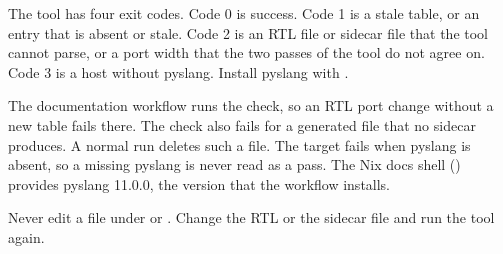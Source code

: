 The tool has four exit codes. Code 0 is success. Code 1 is a stale table, or an entry that is absent or stale. Code 2 is an RTL file or sidecar file that the tool cannot parse, or a port width that the two passes of the tool do not agree on. Code 3 is a host without pyslang. Install pyslang with .

The documentation workflow runs the check, so an RTL port change without a new table fails there. The check also fails for a generated file that no sidecar produces. A normal run deletes such a file. The target  fails when pyslang is absent, so a missing pyslang is never read as a pass. The Nix docs shell () provides pyslang 11.0.0, the version that the workflow installs.

Never edit a file under  or . Change the RTL or the sidecar file and run the tool again.

